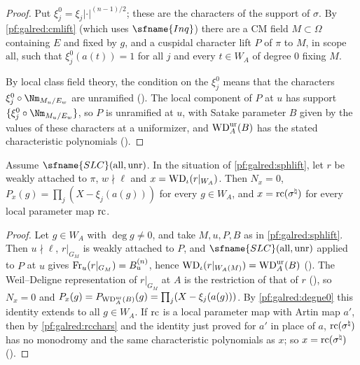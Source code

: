\begin{proof}
Put $\xi_j^0=\xi_j|\cdot|^{(n-1)/2}$; these are the characters of the support of $\sigma$. By \cref{pf:galred:cmlift}
(which uses $\sfname{Inq}$) there are a CM field $M\subset\Omega$ containing $E$ and fixed by $g$, and a cuspidal character
lift $P$ of $\pi$ to $M$, in scope $\mathrm{all}$, such that $\xi^0_j(a(t))=1$ for all $j$ and every $t\in W_A$ of degree $0$
fixing $M$.

By local class field theory, the condition on the $\xi^0_j$ means that the characters $\xi^0_j\circ\Nm_{M_u/E_w}$ are
unramified (). The local component of $P$ at $u$
has support $\{\xi^0_j\circ\Nm_{M_u/E_w}\}$, so $P$ is unramified at $u$, with Satake parameter $B$ given by the values of
these characters at a uniformizer, and $\mathrm{WD}^{\mathrm{ur}}_A(B)$ has the stated characteristic polynomials
().
\end{proof}

\begin{lemma}\label{pf:galred:toralgal}
Assume $\sfname{SLC}(\mathrm{all},\mathrm{unr})$. In the situation of \cref{pf:galred:sphlift}, let $r$ be weakly attached
to $\pi$, $w\nmid\ell$ and $x=\mathrm{WD}_\iota(r|_{W_A})$. Then $N_x=0$, $P_x(g)=\prod_j(X-\xi_j(a(g)))$ for every
$g\in W_A$, and $x=\mathrm{rc}(\sigma^\natural)$ for every local parameter map $\mathrm{rc}$.
\end{lemma}

\begin{proof}
Let $g\in W_A$ with $\deg g\ne0$, and take $M,u,P,B$ as in \cref{pf:galred:sphlift}. Then $u\nmid\ell$, $r|_{G_M}$ is
weakly attached to $P$, and $\sfname{SLC}(\mathrm{all},\mathrm{unr})$ applied to $P$ at $u$ gives
$\operatorname{Fr}_u(r|_{G_M})=B^{(n)}_u$, hence $\mathrm{WD}_\iota(r|_{W_A(M)})=\mathrm{WD}^{\mathrm{ur}}_A(B)$
(). The Weil--Deligne representation of
$r|_{G_M}$ at $A$ is the restriction of that of $r$ (), so $N_x=0$ and
$P_x(g)=P_{\mathrm{WD}^{\mathrm{ur}}_A(B)}(g)=\prod_j(X-\xi_j(a(g)))$. By \cref{pf:galred:degne0} this identity extends to all $g\in W_A$.
If $\mathrm{rc}$ is a local parameter map with Artin map $a'$, then by \cref{pf:galred:rcchars} and the identity just
proved for $a'$ in place of $a$, $\mathrm{rc}(\sigma^\natural)$ has no monodromy and the same characteristic polynomials as
$x$; so $x=\mathrm{rc}(\sigma^\natural)$ ().
\end{proof}

